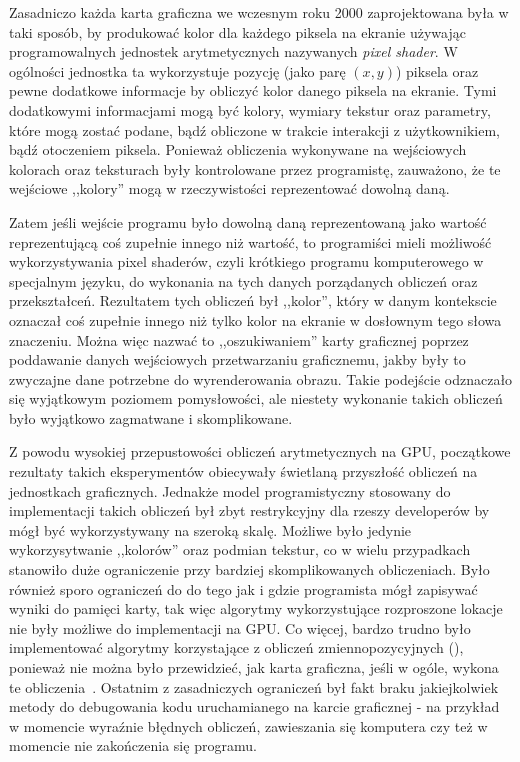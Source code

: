 Zasadniczo każda karta graficzna we wczesnym roku 2000 zaprojektowana była w taki sposób, by produkować kolor dla każdego piksela na ekranie używając programowalnych jednostek arytmetycznych nazywanych \emph{pixel shader}. W ogólności jednostka ta wykorzystuje pozycję (jako parę $(x, y)$) piksela oraz pewne dodatkowe informacje by obliczyć kolor danego piksela na ekranie. Tymi dodatkowymi informacjami mogą być kolory, wymiary tekstur oraz parametry, które mogą zostać podane, bądź obliczone w trakcie interakcji z użytkownikiem, bądź otoczeniem piksela. Ponieważ obliczenia wykonywane na wejściowych kolorach oraz teksturach były kontrolowane przez programistę, zauważono, że te wejściowe ,,kolory'' mogą w rzeczywistości reprezentować dowolną daną.

Zatem jeśli wejście programu było dowolną daną reprezentowaną jako wartość reprezentującą coś zupełnie innego niż wartość, to programiści mieli możliwość wykorzystywania pixel shaderów, czyli krótkiego programu komputerowego w specjalnym języku, do wykonania na tych danych porządanych obliczeń oraz przekształceń. Rezultatem tych obliczeń był ,,kolor'', który w danym kontekscie oznaczał coś zupełnie innego niż tylko kolor na ekranie w dosłownym tego słowa znaczeniu. Można więc nazwać to ,,oszukiwaniem'' karty graficznej poprzez poddawanie danych wejściowych przetwarzaniu graficznemu, jakby były to zwyczajne dane potrzebne do wyrenderowania obrazu. Takie podejście odznaczało się wyjątkowym poziomem pomysłowości, ale niestety wykonanie takich obliczeń było wyjątkowo zagmatwane i skomplikowane.

Z powodu wysokiej przepustowości obliczeń arytmetycznych na GPU, początkowe rezultaty takich eksperymentów obiecywały świetlaną przyszłość obliczeń na jednostkach graficznych. Jednakże model programistyczny stosowany do implementacji takich obliczeń był zbyt restrykcyjny dla rzeszy developerów by mógł być wykorzystywany na szeroką skalę. Możliwe było jedynie wykorzysytwanie ,,kolorów'' oraz podmian tekstur, co w wielu przypadkach stanowiło duże ograniczenie przy bardziej skomplikowanych obliczeniach. Było również sporo ograniczeń do do tego jak i gdzie programista mógł zapisywać wyniki do pamięci karty, tak więc algorytmy wykorzystujące rozproszone lokacje nie były możliwe do implementacji na GPU. Co więcej, bardzo trudno było implementować algorytmy korzystające z obliczeń zmiennopozycyjnych (), ponieważ nie można było przewidzieć, jak karta graficzna, jeśli w ogóle, wykona te obliczenia~\cite{Cuda:Example}. Ostatnim z zasadniczych ograniczeń był fakt braku jakiejkolwiek metody do debugowania kodu uruchamianego na karcie graficznej - na przykład w momencie wyraźnie błędnych obliczeń, zawieszania się komputera czy też w momencie nie zakończenia się programu.

